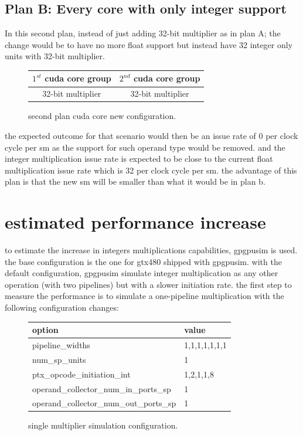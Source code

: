 \documentclass{report}
\begin{document}
   \subsection{Plan B: Every core with only integer support}
   In this second plan, instead of just adding 32-bit multiplier as in plan A; the change would be to have no more float support but instead have 32 integer only units with 32-bit multiplier.
   \begin{figure}[H]
      \centering
       \begin{tabular}{ | c | c | }
    	    \hline
    	    $1^{st}$ cuda core group & $2^{nd}$ cuda core group \\ \hline
    	   32-bit multiplier & 32-bit multiplier \\ \hline
  	\end{tabular}
  	\captionsetup{justification=centering}
  	\caption{second plan cuda core new configuration.}
  	\label{fig:planb_cores}
   \end{figure}
   the expected outcome for that scenario would then be an issue rate of 0 per clock cycle per sm as the support for such operand type would be removed.
   and the integer multiplication issue rate is expected to be close to the current float multiplication issue rate which is 32 per clock cycle per sm.
   the advantage of this plan is that the new sm will be smaller than what it would be in plan b. 
   \section{estimated performance increase}
    to estimate the increase in integers multiplications capabilities, gpgpusim
    is used. the base configuration is the one for gtx480 shipped with gpgpusim.
    with the default configuration, gpgpusim simulate integer multiplication as
    any other operation (with two pipelines) but with a slower initiation rate.
    the first step to measure the performance is to simulate a one-pipeline
    multiplication with the following configuration changes:
    \begin{figure}[h]
    \centering
       \begin{tabular}{ | l | l | }
            \hline
    	    option & value \\ \hline
    	    pipeline\_widths & 1,1,1,1,1,1,1 \\
            num\_sp\_units & 1 \\
            ptx\_opcode\_initiation\_int & 1,2,1,1,8 \\
            operand\_collector\_num\_in\_ports\_sp & 1 \\
            operand\_collector\_num\_out\_ports\_sp & 1 \\ \hline

  	    \end{tabular}
  	\captionsetup{justification=centering}
  	\caption{single multiplier simulation configuration.}
  	\label{tab:1stconfig}
    \end{figure}
\end{document}
